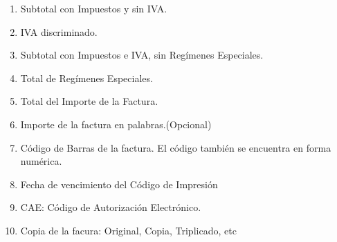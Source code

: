\begin{enumerate}
  \item Subtotal con Impuestos y sin IVA.
  \item IVA discriminado.
  \item Subtotal con Impuestos e IVA, sin Reg\'imenes Especiales.
  \item Total de Reg\'imenes Especiales.
  \item Total del Importe de la Factura.
  \item Importe de la factura en palabras.(Opcional)
  \item C\'odigo de Barras de la factura. El c\'odigo tambi\'en se encuentra en forma num\'erica. 
  \item Fecha de vencimiento del C\'odigo de Impresi\'on
  \item CAE: C\'odigo de Autorizaci\'on Electr\'onico.
  \item Copia de la facura: Original, Copia, Triplicado, etc
\end{enumerate}

